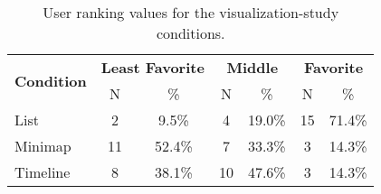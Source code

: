 \begin{table*}[ht]
    \centering
    \caption{User ranking values for the visualization-study conditions.}
    \begin{tabular}{l|cc|cc|cc}
    \toprule
    \multirow{2}{*}{\textbf{Condition}}& \multicolumn{2}{c|}{\textbf{Least Favorite}} & \multicolumn{2}{c|}{\textbf{Middle}} & \multicolumn{2}{c}{\textbf{Favorite}} \\
                & N     & \%             & N    & \%                  & N       & \%                 \\
    \midrule
    List        & 2     & 9.5\%          & 4    & 19.0\%              & 15      & 71.4\%              \\
    Minimap     & 11    & 52.4\%         & 7    & 33.3\%              & 3       & 14.3\%             \\
    Timeline    & 8     & 38.1\%         & 10   & 47.6\%              & 3       & 14.3\%             \\
    \bottomrule
    \end{tabular}
\end{table*}
